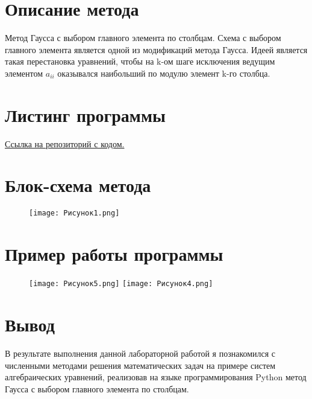 \documentclass[12pt]{report}
\begin{document}
\section*{Описание метода}
Метод Гаусса с выбором главного элемента по столбцам.
Схема с выбором главного элемента является одной из модификаций метода Гаусса. Идеей является такая перестановка уравнений, чтобы на k-ом шаге исключения ведущим элементом $a_{ii}$ оказывался наибольший по модулю элемент k-го столбца.

\section*{Листинг программы}
\href{https://github.com/mysticslippers/math_comp_archive/blob/main/Lab1_comp_math/code/main.py}{Ссылка на репозиторий с кодом.}
\newpage

\section*{Блок-схема метода}

\begin{figure}[h]
        \centering
        \texttt{[image: Рисунок1.png]}
\end{figure}
\newpage

\section*{Пример работы программы}

\begin{figure}[h]
        \centering
        \texttt{[image: Рисунок5.png]}
        \texttt{[image: Рисунок4.png]}
\end{figure}

\section*{Вывод}
В результате выполнения данной лабораторной работой я познакомился с численными методами решения математических задач на примере систем алгебраических уравнений, реализовав на языке программирования Python метод Гаусса с выбором главного элемента по столбцам.
\end{document}
